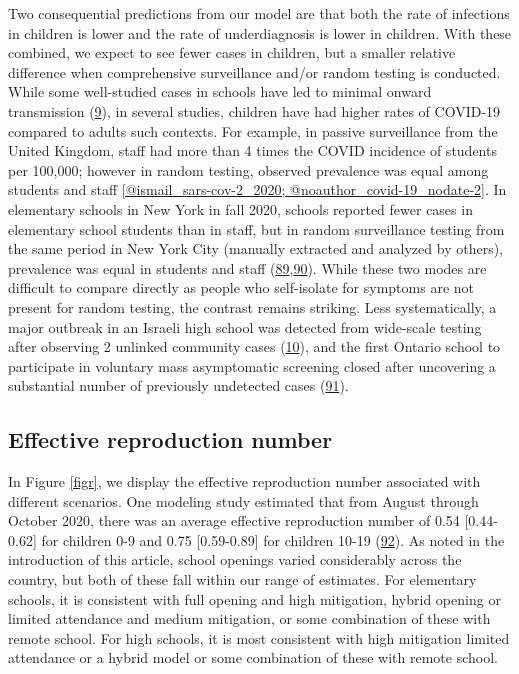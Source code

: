 \documentclass[
]{article}
\begin{document}
Two consequential predictions from our model are that both the rate of
infections in children is lower and the rate of underdiagnosis is lower
in children. With these combined, we expect to see fewer cases in
children, but a smaller relative difference when comprehensive
surveillance and/or random testing is conducted. While some well-studied
cases in schools have led to minimal onward transmission
(\protect\hyperlink{ref-yung_novel_nodate}{9}), in several studies,
children have had higher rates of COVID-19 compared to adults such
contexts. For example, in passive surveillance from the United Kingdom,
staff had more than 4 times the COVID incidence of students per 100,000;
however in random testing, observed prevalence was equal among students
and staff \ref{@ismail_sars-cov-2_2020; @noauthor_covid-19_nodate-2}. In
elementary schools in New York in fall 2020, schools reported fewer
cases in elementary school students than in staff, but in random
surveillance testing from the same period in New York City (manually
extracted and analyzed by others), prevalence was equal in students and
staff
(\protect\hyperlink{ref-oster_opinion_2020}{89},\protect\hyperlink{ref-noauthor_covid_nodate}{90}).
While these two modes are difficult to compare directly as people who
self-isolate for symptoms are not present for random testing, the
contrast remains striking. Less systematically, a major outbreak in an
Israeli high school was detected from wide-scale testing after observing
2 unlinked community cases
(\protect\hyperlink{ref-stein-zamir_large_2020}{10}), and the first
Ontario school to participate in voluntary mass asymptomatic screening
closed after uncovering a substantial number of previously undetected
cases (\protect\hyperlink{ref-noauthor_second_2020}{91}).

\hypertarget{effective-reproduction-number}{%
\subsection{Effective reproduction
number}\label{effective-reproduction-number}}

In Figure \ref{figr}, we display the effective reproduction number
associated with different scenarios. One modeling study estimated that
from August through October 2020, there was an average effective
reproduction number of 0.54 {[}0.44-0.62{]} for children 0-9 and 0.75
{[}0.59-0.89{]} for children 10-19
(\protect\hyperlink{ref-monod_age_2020}{92}). As noted in the
introduction of this article, school openings varied considerably across
the country, but both of these fall within our range of estimates. For
elementary schools, it is consistent with full opening and high
mitigation, hybrid opening or limited attendance and medium mitigation,
or some combination of these with remote school. For high schools, it is
most consistent with high mitigation limited attendance or a hybrid
model or some combination of these with remote school.
\end{document}
